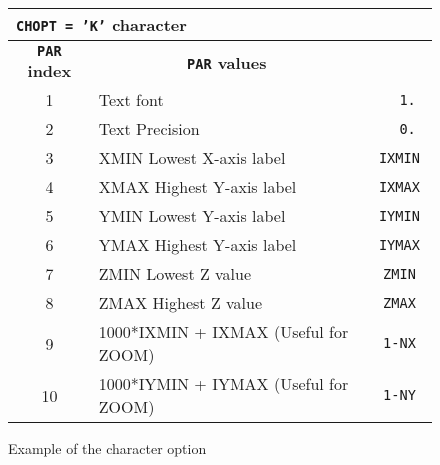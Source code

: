 \begin{figure}[p]
\begin{center}
\begin{tabular}{||c|p{}|>{\tt}r||}
\hline
\multicolumn{3}{||l||}{\bf {\tt CHOPT = 'K'} character}     \\
\hline
\multicolumn{1}{||c|}{\bf {\tt PAR} index}        &
\multicolumn{1}{c|}{\bf {\tt PAR} values}         &
\multicolumn{1}{c||}{\bf default}                           \\
\hline
1  & Text font                                                      &   1.    \\
2  & Text Precision                                                 &   0.    \\
3  & XMIN Lowest X-axis label                                       &   IXMIN \\
4  & XMAX Highest Y-axis label                                      &   IXMAX \\
5  & YMIN Lowest Y-axis label                                       &   IYMIN \\
6  & YMAX Highest Y-axis label                                      &   IYMAX \\
7  & ZMIN Lowest Z value                                            &   ZMIN  \\
8  & ZMAX Highest Z value                                           &   ZMAX  \\
9  & 1000*IXMIN + IXMAX (Useful for ZOOM)                           &   1-NX  \\
10 & 1000*IYMIN + IYMAX (Useful for ZOOM)                           &   1-NY  \\
\hline
\end{tabular}
\end{center}

\bigskip

\begin{center} \mbox{} \end{center}
\caption{Example of the \protect{} character \protect{} option}
\label{TABK}
\end{figure}

